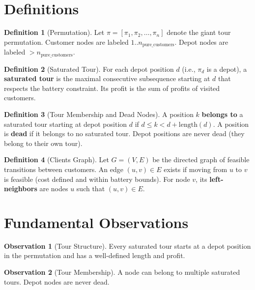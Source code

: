 \documentclass[11pt]{article}
\theoremstyle{definition}
\newtheorem{definition}{Definition}[section]
\newtheorem{observation}{Observation}[section]
\begin{document}
\section{Definitions}

\begin{definition}[Permutation]
Let $\pi = [\pi_1, \pi_2, \ldots, \pi_n]$ denote the giant tour permutation. Customer nodes are labeled $1..n_{\text{pure\_customers}}$. Depot nodes are labeled $> n_{\text{pure\_customers}}$.
\end{definition}

\begin{definition}[Saturated Tour]
For each depot position $d$ (i.e., $\pi_d$ is a depot), a \textbf{saturated tour} is the maximal consecutive subsequence starting at $d$ that respects the battery constraint. Its profit is the sum of profits of visited customers.
\end{definition}

\begin{definition}[Tour Membership and Dead Nodes]
A position $k$ \textbf{belongs to} a saturated tour starting at depot position $d$ if $d \leq k < d + \text{length}(d)$. A position is \textbf{dead} if it belongs to no saturated tour. Depot positions are never dead (they belong to their own tour).
\end{definition}

\begin{definition}[Clients Graph]
Let $G = (V, E)$ be the directed graph of feasible transitions between customers. An edge $(u, v) \in E$ exists if moving from $u$ to $v$ is feasible (cost defined and within battery bounds). For node $v$, its \textbf{left-neighbors} are nodes $u$ such that $(u, v) \in E$.
\end{definition}

\section{Fundamental Observations}

\begin{observation}[Tour Structure]
Every saturated tour starts at a depot position in the permutation and has a well-defined length and profit.
\end{observation}

\begin{observation}[Tour Membership]
A node can belong to multiple saturated tours. Depot nodes are never dead.
\end{observation}
\end{document}

